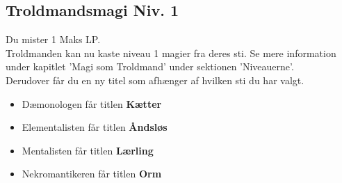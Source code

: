 \subsection{Troldmandsmagi Niv. 1}
Du mister 1 Maks LP.\\
Troldmanden kan nu kaste niveau 1 magier fra deres sti. Se mere information under kapitlet 'Magi som Troldmand' under sektionen 'Niveauerne'. \\
Derudover får du en ny titel som afhænger af hvilken sti du har valgt.\\
\begin{itemize}
    \item Dæmonologen får titlen \textbf{Kætter}
    \item Elementalisten får titlen \textbf{Åndsløs}
    \item Mentalisten får titlen \textbf{Lærling}
    \item Nekromantikeren får titlen \textbf{Orm}
\end{itemize}